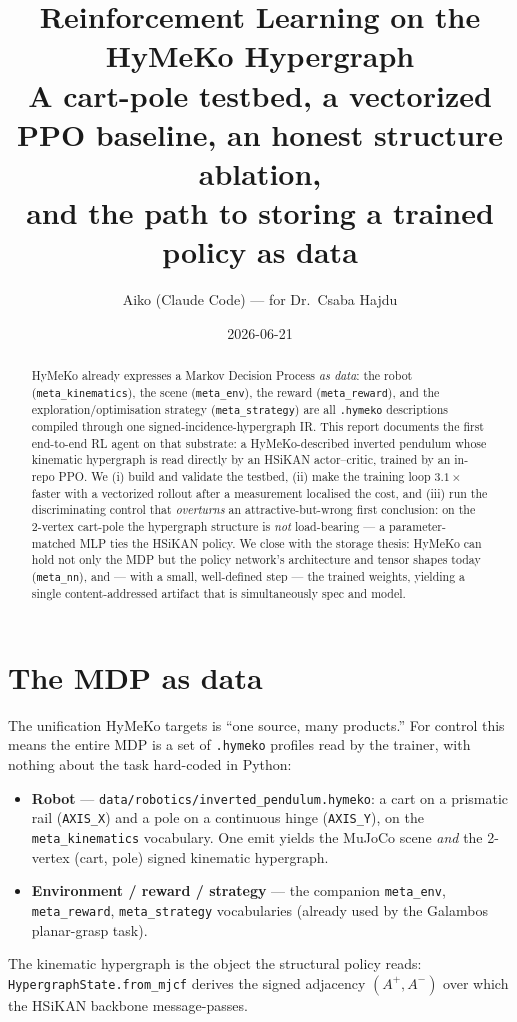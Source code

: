 \documentclass[11pt]{article}
\title{\textbf{Reinforcement Learning on the HyMeKo Hypergraph}\\[2pt]
\large A cart-pole testbed, a vectorized PPO baseline, an honest structure ablation,\\
and the path to storing a trained policy as data}
\author{Aiko (Claude Code) --- for Dr.\ Csaba Hajdu}
\date{2026-06-21}
\newcommand{\code}[1]{\texttt{\small #1}}
\begin{document}
\maketitle

\begin{abstract}
\noindent HyMeKo already expresses a Markov Decision Process \emph{as data}: the robot
(\code{meta\_kinematics}), the scene (\code{meta\_env}), the reward (\code{meta\_reward}), and the
exploration/optimisation strategy (\code{meta\_strategy}) are all \code{.hymeko} descriptions compiled
through one signed-incidence-hypergraph IR. This report documents the first end-to-end RL agent on that
substrate: a HyMeKo-described inverted pendulum whose kinematic hypergraph is read directly by an
HSiKAN actor--critic, trained by an in-repo PPO. We (i) build and validate the testbed, (ii) make the
training loop $3.1\times$ faster with a vectorized rollout after a measurement localised the cost, and
(iii) run the discriminating control that \emph{overturns} an attractive-but-wrong first conclusion: on the
2-vertex cart-pole the hypergraph structure is \emph{not} load-bearing --- a parameter-matched MLP ties the
HSiKAN policy. We close with the storage thesis: HyMeKo can hold not only the MDP but the policy network's
architecture and tensor shapes today (\code{meta\_nn}), and --- with a small, well-defined step --- the
trained weights, yielding a single content-addressed artifact that is simultaneously spec and model.
\end{abstract}

\section{The MDP as data}
The unification HyMeKo targets is ``one source, many products.'' For control this means the entire MDP is a
set of \code{.hymeko} profiles read by the trainer, with nothing about the task hard-coded in Python:
\begin{itemize}[nosep]
  \item \textbf{Robot} --- \code{data/robotics/inverted\_pendulum.hymeko}: a cart on a prismatic rail
        (\code{AXIS\_X}) and a pole on a continuous hinge (\code{AXIS\_Y}), on the \code{meta\_kinematics}
        vocabulary. One emit yields the MuJoCo scene \emph{and} the 2-vertex (cart, pole) signed kinematic
        hypergraph.
  \item \textbf{Environment / reward / strategy} --- the companion \code{meta\_env}, \code{meta\_reward},
        \code{meta\_strategy} vocabularies (already used by the Galambos planar-grasp task).
\end{itemize}
The kinematic hypergraph is the object the structural policy reads: \code{HypergraphState.from\_mjcf}
derives the signed adjacency $(A^+,A^-)$ over which the HSiKAN backbone message-passes.
\end{document}
